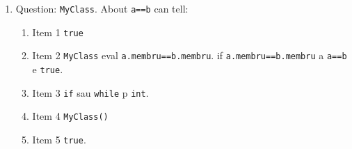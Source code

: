 \documentclass[a4paper,10pt]{article}%
\begin{document}
\twocolumn
{}

 \setlength{\itemsep}{1pt}
 \setlength{\parskip}{0pt}
 \setlength{\parsep}{0pt}
\balance
\begin{enumerate}

\item Question: \lstinline!MyClass!. About \lstinline!a==b! can tell:
\begin{enumerate}
	\item Item 1 \lstinline!true! 
	\item Item 2 \lstinline!MyClass! eval \lstinline!a.membru==b.membru!. if 	\lstinline!a.membru==b.membru! a \lstinline!a==b! e \lstinline!true!.
	\item Item 3 \lstinline!if! sau \lstinline!while! p \lstinline!int!.  
	\item Item 4 \lstinline!MyClass()!
	\item Item 5 \lstinline!true!. %
\end{enumerate}

\end{enumerate}



\end{document}
